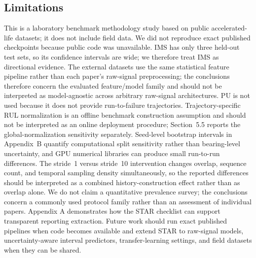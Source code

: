 \documentclass[pdflatex,sn-basic,NameDate]{sn-jnl}
\begin{document}
\begin{table}[t]
\centering
\caption{Conventional reporting patterns versus STAR recommendations.}
\label{tab:star_before_after}
\small
{}
\end{table}

\subsection{Limitations}
This is a laboratory benchmark methodology study based on public accelerated-life datasets; it does not include field data. We did not reproduce exact published checkpoints because public code was unavailable. IMS has only three held-out test sets, so its confidence intervals are wide; we therefore treat IMS as directional evidence. The external datasets use the same statistical feature pipeline rather than each paper's raw-signal preprocessing; the conclusions therefore concern the evaluated feature/model family and should not be interpreted as model-agnostic across arbitrary raw-signal architectures. PU is not used because it does not provide run-to-failure trajectories. Trajectory-specific RUL normalization is an offline benchmark construction assumption and should not be interpreted as an online deployment procedure; Section~5.5 reports the global-normalization sensitivity separately. Seed-level bootstrap intervals in Appendix~B quantify computational split sensitivity rather than bearing-level uncertainty, and GPU numerical libraries can produce small run-to-run differences. The stride~1 versus stride~10 intervention changes overlap, sequence count, and temporal sampling density simultaneously, so the reported differences should be interpreted as a combined history-construction effect rather than as overlap alone. We do not claim a quantitative prevalence survey; the conclusions concern a commonly used protocol family rather than an assessment of individual papers. Appendix A demonstrates how the STAR checklist can support transparent reporting extraction. Future work should run exact published pipelines when code becomes available and extend STAR to raw-signal models, uncertainty-aware interval predictors, transfer-learning settings, and field datasets when they can be shared.
\end{document}
